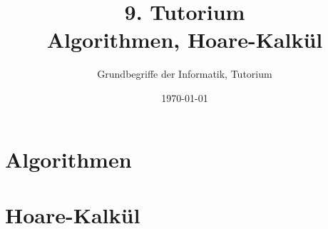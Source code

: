 



\usepackage{tcolorbox}

\newcommand{\HTB}[1]{\ensuremath{\colorbox{lightgray!90}{\{ #1 \}}}}
\newcommand{\HT}[3]{\ensuremath{\HTB{#1} \; #2 \; \HTB{#3}}}


\title[Algorithmen, Hoare-Kalkül]{9. Tutorium\\ Algorithmen, Hoare-Kalkül}
\subtitle{Grundbegriffe der Informatik, Tutorium \hashtag\mytutnumber}
\date{\today}


\titleframe
\roadmap


\section{Algorithmen}


\section{Hoare-Kalkül}


%


\section{}
\questionframe
{}
